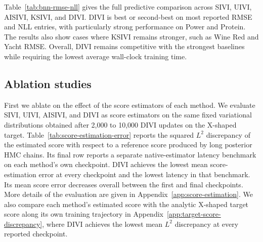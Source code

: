 

Table~\ref{tab:bnn-rmse-nll} gives the full predictive comparison across SIVI, UIVI, AISIVI, KSIVI, and DIVI.  DIVI is best or second-best on most reported RMSE and NLL entries, with particularly strong performance on Power and Protein.  The results also show cases where KSIVI remains stronger, such as Wine Red and Yacht RMSE.  Overall, DIVI remains competitive with the strongest baselines while requiring the lowest average wall-clock training time.

\subsection{Ablation studies}
\label{subsec:score-estimation}

First we ablate on the effect of the score estimators of each method. We evaluate SIVI, UIVI, AISIVI, and DIVI as score estimators on the same fixed variational distributions obtained after 2,000 to 10,000 DIVI updates on the X-shaped target. Table~\ref{tab:score-estimation-error} reports the squared $L^2$ discrepancy of the estimated score with respect to a reference score produced by long posterior HMC chains. Its final row reports a separate native-estimator latency benchmark on each method's own checkpoint. DIVI achieves the lowest mean score-estimation error at every checkpoint and the lowest latency in that benchmark. Its mean score error decreases overall between the first and final checkpoints. More details of the evaluation are given in Appendix~\ref{app:score-estimation}. We also compare each method's estimated score with the analytic X-shaped target score along its own training trajectory in Appendix~\ref{app:target-score-discrepancy}, where DIVI achieves the lowest mean $L^2$ discrepancy at every reported checkpoint.

